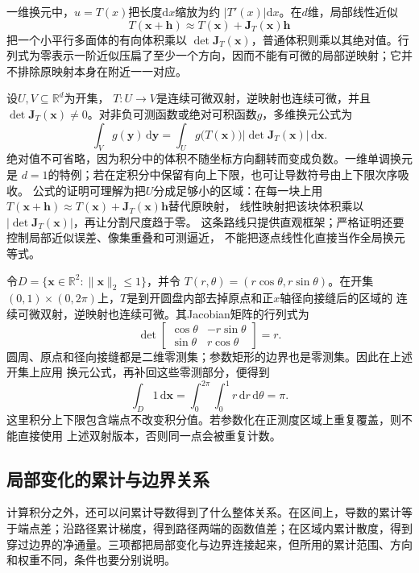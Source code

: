 一维换元中，$u=T(x)$把长度$\mathrm{d}x$缩放为约 $|T'(x)|\mathrm{d}x$。在$d$维，局部线性近似
\[   T(\bm{x}+\bm{h})   \approx   T(\bm{x})+\bm{J}_T(\bm{x})\bm{h} \]
把一个小平行多面体的有向体积乘以 $\det\bm{J}_T(\bm{x})$，普通体积则乘以其绝对值。行列式为零表示一阶近似压扁了至少一个方向，因而不能有可微的局部逆映射；它并不排除原映射本身在附近一一对应。

设$U,V\subseteq\mathbb{R}^d$为开集， $T:U\to V$是连续可微双射，逆映射也连续可微，并且 $\det\bm{J}_T(\bm{x})\neq0$。对非负可测函数或绝对可积函数$g$，多维换元公式为
\begin{equation}
  \int_V g(\bm{y})\,\mathrm{d}\bm{y}
  =
  \int_U
  g\bigl(T(\bm{x})\bigr)
  \left|\det\bm{J}_T(\bm{x})\right|
  \,\mathrm{d}\bm{x}.
\label{eq:analysis-multivariate-change-variables}
\end{equation}
绝对值不可省略，因为积分中的体积不随坐标方向翻转而变成负数。一维单调换元是 $d=1$的特例；若在定积分中保留有向上下限，也可让导数符号由上下限次序吸收。
公式的证明可理解为把$U$分成足够小的区域：在每一块上用
$T(\bm{x}+\bm{h})\approx T(\bm{x})+\bm{J}_T(\bm{x})\bm{h}$替代原映射，
线性映射把该块体积乘以$|\det\bm{J}_T(\bm{x})|$，再让分割尺度趋于零。
这条路线只提供直观框架；严格证明还要控制局部近似误差、像集重叠和可测逼近，
不能把逐点线性化直接当作全局换元等式。
\begin{example}[极坐标中的面积权重]
\label{ex:analysis-polar-coordinate-jacobian}
令$D=\{\bm{x}\in\mathbb{R}^2:\lVert\bm{x}\rVert_2\leq1\}$，并令
$T(r,\theta)=(r\cos\theta,r\sin\theta)$。在开集
$(0,1)\times(0,2\pi)$上，$T$是到开圆盘内部去掉原点和正$x$轴径向接缝后的区域的
连续可微双射，逆映射也连续可微。其Jacobian矩阵的行列式为
\[   \det
\begin{bmatrix}     \cos\theta & -r\sin\theta\\     \sin\theta & r\cos\theta
\end{bmatrix}   =r. \]
圆周、原点和径向接缝都是二维零测集；参数矩形的边界也是零测集。因此在上述开集上应用
换元公式，再补回这些零测部分，便得到
\[   \int_D1\,\mathrm{d}\bm{x}   =   \int_0^{2\pi}\int_0^1r\,\mathrm{d}r\,\mathrm{d}\theta   =\pi. \]
这里积分上下限包含端点不改变积分值。若参数化在正测度区域上重复覆盖，则不能直接使用
上述双射版本，否则同一点会被重复计数。
\end{example}
\subsection{局部变化的累计与边界关系}

计算积分之外，还可以问累计导数得到了什么整体关系。在区间上，导数的累计等于端点差；沿路径累计梯度，得到路径两端的函数值差；在区域内累计散度，得到穿过边界的净通量。三项都把局部变化与边界连接起来，但所用的累计范围、方向和权重不同，条件也要分别说明。

